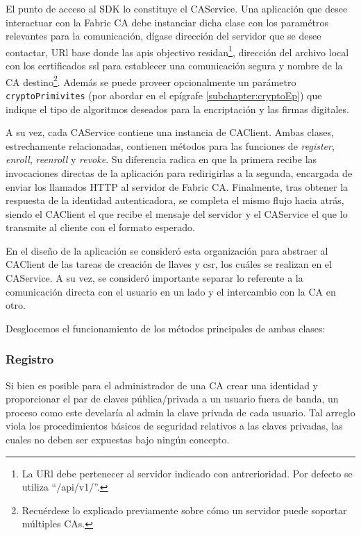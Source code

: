 El punto de acceso al SDK lo constituye el CAService. Una aplicaci\'on que desee interactuar con la Fabric CA debe instanciar dicha clase con los param\'etros relevantes para la comunicaci\'on, d\'igase direcci\'on del servidor que se desee contactar, URl base donde las apis objectivo residan\footnote{La URl debe pertenecer al servidor indicado con antrerioridad. Por defecto se utiliza “/api/v1/”.}, direcci\'on del archivo local con los certificados ssl para establecer una comunicaci\'on segura y nombre de la CA destino\footnote{Recu\'erdese lo explicado previamente sobre c\'omo un servidor puede soportar m\'ultiples CAs.}. Adem\'as se puede  proveer opcionalmente un par\'ametro \texttt{cryptoPrimivites} (por abordar en el ep\'igrafe \ref{subchapter:cryptoEp}) que indique el tipo de algoritmos deseados para la encriptaci\'on y las firmas digitales.

A su vez, cada CAService contiene una instancia de CAClient. Ambas clases, estrechamente relacionadas, contienen m\'etodos para las funciones de \emph{register}, \emph{enroll}, \emph{reenroll} y \emph{revoke}. Su diferencia radica en que la primera recibe las invocaciones directas de la aplicaci\'on para redirigirlas a la segunda, encargada de enviar los llamados HTTP al servidor de Fabric CA. Finalmente, tras obtener la respuesta de la identidad autenticadora, se completa el mismo flujo hacia atr\'as, siendo el CAClient el que recibe el mensaje del servidor y el CAService el que lo transmite al cliente con el formato esperado.

En el dise\~no de la aplicaci\'on se consider\'o esta organizaci\'on para abstraer al CAClient de las tareas de creaci\'on de llaves y csr, los cu\'ales se realizan en el CAService. A su vez, se consider\'o importante separar lo referente a la comunicaci\'on directa con el usuario en un lado y el intercambio con la CA en otro.

Desglocemos el funcionamiento de los m\'etodos principales de ambas clases:

\subsubsection{Registro}
Si bien es posible para el administrador de una CA crear una identidad y proporcionar el par de claves pública/privada a un usuario fuera de banda, un proceso como este develar\'ia al admin la clave privada de cada usuario. Tal arreglo viola los procedimientos básicos de seguridad relativos a las claves privadas, las cuales no deben ser expuestas bajo ningún concepto.

